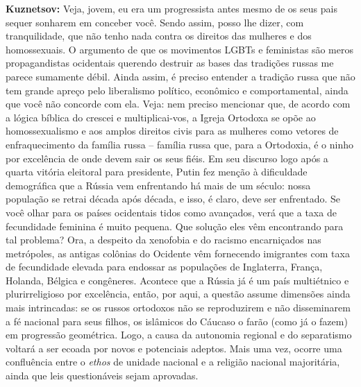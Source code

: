 \textbf{Kuznetsov:} Veja, jovem, eu era um progressista antes mesmo de
os seus pais sequer sonharem em conceber você. Sendo assim, posso lhe
dizer, com tranquilidade, que não tenho nada contra os direitos das
mulheres e dos homossexuais. O argumento de que os movimentos LGBTs e
feministas são meros propagandistas ocidentais querendo destruir as
bases das tradições russas me parece sumamente débil. Ainda assim, é
preciso entender a tradição russa que não tem grande apreço pelo
liberalismo político, econômico e comportamental, ainda que você não
concorde com ela. Veja: nem preciso mencionar que, de acordo com a
lógica bíblica do crescei e multiplicai-vos, a Igreja Ortodoxa se opõe
ao homossexualismo e aos amplos direitos civis para as mulheres como
vetores de enfraquecimento da família russa -- família russa que, para a
Ortodoxia, é o ninho por excelência de onde devem sair os seus fiéis. Em
seu discurso logo após a quarta vitória eleitoral para presidente, Putin
fez menção à dificuldade demográfica que a Rússia vem enfrentando há
mais de um século: nossa população se retrai década após década, e isso,
é claro, deve ser enfrentado. Se você olhar para os países ocidentais
tidos como avançados, verá que a taxa de fecundidade feminina é muito
pequena. Que solução eles vêm encontrando para tal problema? Ora, a
despeito da xenofobia e do racismo encarniçados nas metrópoles, as
antigas colônias do Ocidente vêm fornecendo imigrantes com taxa de
fecundidade elevada para endossar as populações de Inglaterra, França,
Holanda, Bélgica e congêneres. Acontece que a Rússia já é um país
multiétnico e plurirreligioso por excelência, então, por aqui, a questão
assume dimensões ainda mais intrincadas: se os russos ortodoxos não se
reproduzirem e não disseminarem a fé nacional para seus filhos, os
islâmicos do Cáucaso o farão (como já o fazem) em progressão geométrica.
Logo, a causa da autonomia regional e do separatismo voltará a ser
ecoada por novos e potenciais adeptos. Mais uma vez, ocorre uma
confluência entre o \emph{ethos} de unidade nacional e a religião
nacional majoritária, ainda que leis questionáveis sejam aprovadas.

